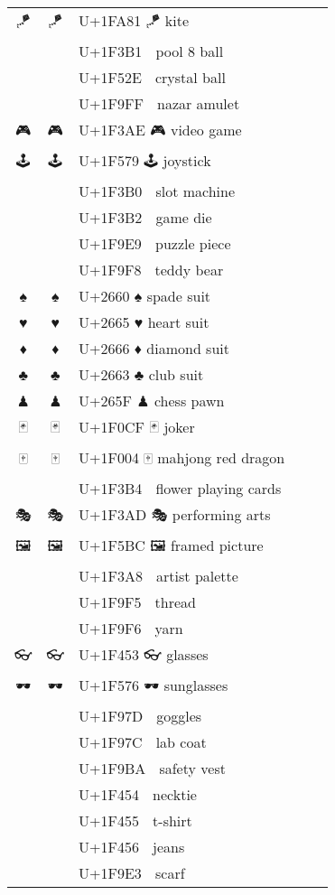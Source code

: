 \documentclass[a4paper,12pt]{ltjarticle}
\newcommand{\fontA}[1]{{\fontspec[RawFeature={mode=harf,+dist,+ccmp}]{Segoe UI Emoji} #1}}
\newcommand{\fontB}[1]{{\fontspec[RawFeature={mode=harf,+dist,+ccmp}]{Noto Color Emoji} #1}}
\begin{document}
\begin{longtable}[c]{ccp{0.8\linewidth}}
\fontA{🪁}&\fontB{🪁}&U+1FA81 🪁 kite\\
\fontA{🎱}&\fontB{🎱}&U+1F3B1 🎱 pool 8 ball\\
\fontA{🔮}&\fontB{🔮}&U+1F52E 🔮 crystal ball\\
\fontA{🧿}&\fontB{🧿}&U+1F9FF 🧿 nazar amulet\\
\fontA{🎮}&\fontB{🎮}&U+1F3AE 🎮 video game\\
\fontA{🕹}&\fontB{🕹}&U+1F579 🕹 joystick\\
\fontA{🎰}&\fontB{🎰}&U+1F3B0 🎰 slot machine\\
\fontA{🎲}&\fontB{🎲}&U+1F3B2 🎲 game die\\
\fontA{🧩}&\fontB{🧩}&U+1F9E9 🧩 puzzle piece\\
\fontA{🧸}&\fontB{🧸}&U+1F9F8 🧸 teddy bear\\
\fontA{♠}&\fontB{♠}&U+2660 ♠ spade suit\\
\fontA{♥}&\fontB{♥}&U+2665 ♥ heart suit\\
\fontA{♦}&\fontB{♦}&U+2666 ♦ diamond suit\\
\fontA{♣}&\fontB{♣}&U+2663 ♣ club suit\\
\fontA{♟}&\fontB{♟}&U+265F ♟ chess pawn\\
\fontA{🃏}&\fontB{🃏}&U+1F0CF 🃏 joker\\
\fontA{🀄}&\fontB{🀄}&U+1F004 🀄 mahjong red dragon\\
\fontA{🎴}&\fontB{🎴}&U+1F3B4 🎴 flower playing cards\\
\fontA{🎭}&\fontB{🎭}&U+1F3AD 🎭 performing arts\\
\fontA{🖼}&\fontB{🖼}&U+1F5BC 🖼 framed picture\\
\fontA{🎨}&\fontB{🎨}&U+1F3A8 🎨 artist palette\\
\fontA{🧵}&\fontB{🧵}&U+1F9F5 🧵 thread\\
\fontA{🧶}&\fontB{🧶}&U+1F9F6 🧶 yarn\\
\fontA{👓}&\fontB{👓}&U+1F453 👓 glasses\\
\fontA{🕶}&\fontB{🕶}&U+1F576 🕶 sunglasses\\
\fontA{🥽}&\fontB{🥽}&U+1F97D 🥽 goggles\\
\fontA{🥼}&\fontB{🥼}&U+1F97C 🥼 lab coat\\
\fontA{🦺}&\fontB{🦺}&U+1F9BA 🦺 safety vest\\
\fontA{👔}&\fontB{👔}&U+1F454 👔 necktie\\
\fontA{👕}&\fontB{👕}&U+1F455 👕 t-shirt\\
\fontA{👖}&\fontB{👖}&U+1F456 👖 jeans\\
\fontA{🧣}&\fontB{🧣}&U+1F9E3 🧣 scarf\\

\end{longtable}
\end{document}
